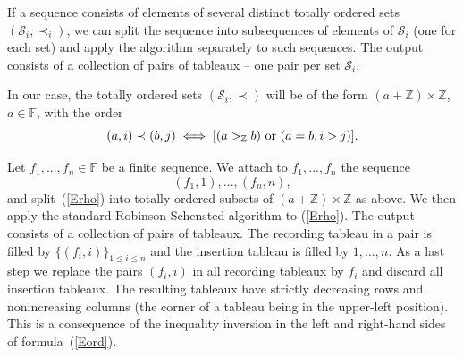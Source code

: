 \documentclass[10pt]{amsart}\oddsidemargin -1mm \evensidemargin -1mm \topmargin -15mm\headheight5mm \headsep 3.5mm \textheight 245mm\textwidth 170mm
\theoremstyle{definition}\newtheorem{theorem}{Theorem}[section]\newtheorem{lemma}[theorem]{Lemma}\newtheorem{remark}[theorem]{Remark}\newtheorem{proposition}[theorem]{Proposition}\newtheorem{corollary}[theorem]{Corollary}\newtheorem{definition}[theorem]{Definition}\newtheorem{Ex}[theorem]{Example}\newtheorem{obs}[theorem]{Observation}\newtheorem{nota}[theorem]{Notation}
\begin{document}
If a sequence consists of elements of several distinct totally ordered sets $(\mathcal S_i, \prec_i)$, we can split the sequence into subsequences of elements of $\mathcal S_i$ (one for each set) and apply the algorithm separately to such sequences. 
The output consists of a collection of pairs of tableaux -- one pair per set $\mathcal S_i$. 

In our case, the totally ordered sets $(\mathcal S_i, \prec)$ will be of the form $(a+\mathbb Z)\times\mathbb Z$, $a\in\mathbb F$, with the order 
\begin{equation}(a, i)\prec (b, j)\iff[(a>_\mathbb Zb){\rm~or~}(a=b, i>j)].\label{Eord}\end{equation}

Let $f_1,..., f_n\in \mathbb F$ be a finite sequence. We attach to $f_1,..., f_n$ the sequence
\begin{equation}\label{Erho}(f_1, 1),..., (f_n, n),\end{equation}
and split~(\ref{Erho}) into totally ordered subsets of $(a+\mathbb Z)\times\mathbb Z$ as above. 
We then apply the standard Robinson-Schensted algorithm to (\ref{Erho}). 
The output consists of a collection of pairs of tableaux. 
The recording tableau in a pair is filled by $\{(f_i, i)\}_{1\le i\le n}$ and the insertion tableau is filled by $1,..., n$. 
As a last step we replace the pairs $(f_i, i)$ in all recording tableaux by $f_i$ and discard all insertion tableaux. 
The resulting tableaux have strictly decreasing rows and nonincreasing columns (the corner of a tableau being in the upper-left position). 
This is a consequence of the inequality inversion in the left and right-hand sides of formula~(\ref{Eord}).
\end{document}

